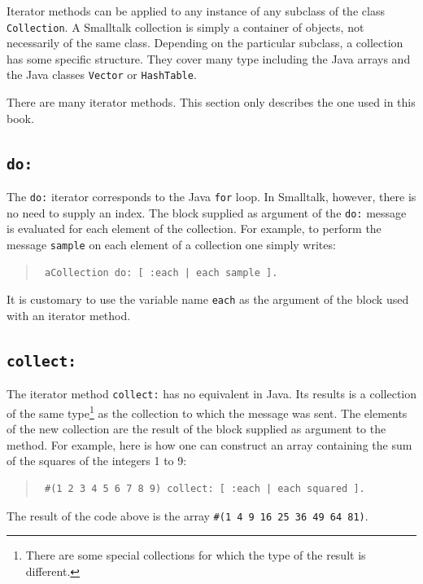 \documentclass[twoside]{book}
\begin{document}
Iterator methods can be applied to any instance of any subclass of
the class {\tt Collection}. A Smalltalk collection is simply a
container of objects, not necessarily of the same class. Depending
on the particular subclass, a collection has some specific
structure. They cover many type including the Java arrays and the
Java classes {\tt Vector} or {\tt HashTable}.

There are many iterator methods. This section only describes the
one used in this book.

\subsection{\tt do:}
The {\tt do:} iterator corresponds to the Java {\tt for} loop. In
Smalltalk, however, there is no need to supply an index. The block
 supplied as argument of the {\tt do:} message is evaluated
for each element of the collection. For example, to perform the
message {\tt sample} on each element of a collection one simply
writes:
\begin{quote}
\begin{verbatim}
 aCollection do: [ :each | each sample ].
\end{verbatim}
\end{quote}
It is customary to use the variable name {\tt each} as the
argument of the block used with an iterator method.

\subsection{\tt collect:}
\label{sec:collect} The iterator method {\tt collect:} has no
equivalent in Java. Its results is a collection of the same
type\footnote{There are some special collections for which the
type of the result is different.} as the collection to which the
message was sent. The elements of the new collection are the
result of the block supplied as argument to the method.
For example, here is how one can construct an array containing the
sum of the squares of the integers 1 to 9:
\begin{quote}
\begin{verbatim}
 #(1 2 3 4 5 6 7 8 9) collect: [ :each | each squared ].
\end{verbatim}
\end{quote}
The result of the code above is the array {\tt \#(1 4 9 16 25 36
49 64 81)}.
\end{document}
